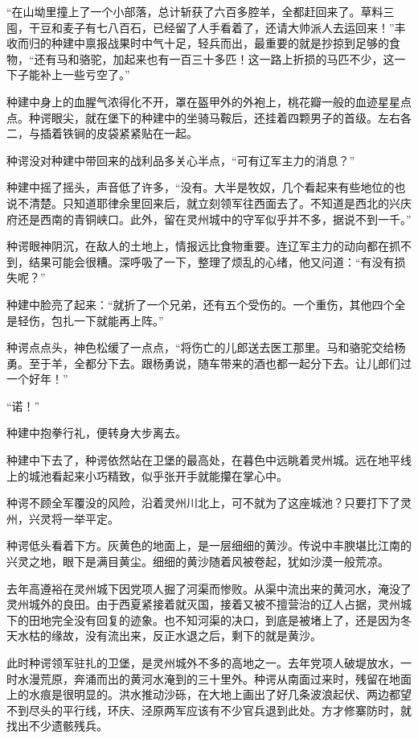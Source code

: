 “在山坳里撞上了一个小部落，总计斩获了六百多腔羊，全都赶回来了。草料三囤，干豆和麦子有七八百石，已经留了人手看着了，还请大帅派人去运回来！”丰收而归的种建中禀报战果时中气十足，轻兵而出，最重要的就是抄掠到足够的食物，“还有马和骆驼，加起来也有一百三十多匹！这一路上折损的马匹不少，这一下子能补上一些亏空了。”

种建中身上的血腥气浓得化不开，罩在盔甲外的外袍上，桃花瓣一般的血迹星星点点。种谔眼尖，就在堡下的种建中的坐骑马鞍后，还挂着四颗男子的首级。左右各二，与插着铁锏的皮袋紧紧贴在一起。

种谔没对种建中带回来的战利品多关心半点，“可有辽军主力的消息？”

种建中摇了摇头，声音低了许多，“没有。大半是牧奴，几个看起来有些地位的也说不清楚。只知道耶律余里回来后，就立刻领军往西面去了。不知道是西北的兴庆府还是西南的青铜峡口。此外，留在灵州城中的守军似乎并不多，据说不到一千。”

种谔眼神阴沉，在敌人的土地上，情报远比食物重要。连辽军主力的动向都在抓不到，结果可能会很糟。深呼吸了一下，整理了烦乱的心绪，他又问道：“有没有损失呢？”

种建中脸亮了起来：“就折了一个兄弟，还有五个受伤的。一个重伤，其他四个全是轻伤，包扎一下就能再上阵。”

种谔点点头，神色松缓了一点点，“将伤亡的儿郎送去医工那里。马和骆驼交给杨勇。至于羊，全都分下去。跟杨勇说，随车带来的酒也都一起分下去。让儿郎们过一个好年！”

“诺！”

种建中抱拳行礼，便转身大步离去。

种建中下去了，种谔依然站在卫堡的最高处，在暮色中远眺着灵州城。远在地平线上的城池看起来小巧精致，似乎张开手就能攥在掌心中。

种谔不顾全军覆没的风险，沿着灵州川北上，可不就为了这座城池？只要打下了灵州，兴灵将一举平定。

种谔低头看着下方。灰黄色的地面上，是一层细细的黄沙。传说中丰腴堪比江南的兴灵之地，眼下是满目黄尘。细细的黄沙随着风被卷起，犹如沙漠一般荒凉。

去年高遵裕在灵州城下因党项人掘了河渠而惨败。从渠中流出来的黄河水，淹没了灵州城外的良田。由于西夏紧接着就灭国，接着又被不擅营治的辽人占据，灵州城下的田地完全没有回复的迹象。也不知河渠的决口，到底是被堵上了，还是因为冬天水枯的缘故，没有流出来，反正水退之后，剩下的就是黄沙。

此时种谔领军驻扎的卫堡，是灵州城外不多的高地之一。去年党项人破堤放水，一时水漫荒原，奔涌而出的黄河水淹到的三十里外。种谔从南面过来时，残留在地面上的水痕是很明显的。洪水推动沙砾，在大地上画出了好几条波浪起伏、两边都望不到尽头的平行线，环庆、泾原两军应该有不少官兵退到此处。方才修寨防时，就找出不少遗骸残兵。

